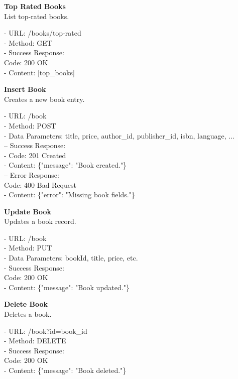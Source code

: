 \begin{flushleft}
\textbf{Top Rated Books} \\
List top-rated books.

- URL: /books/top-rated \\
- Method: GET \\
- Success Response: \\
Code: 200 OK \\
- Content: [top\_books]
\end{flushleft}

\begin{flushleft}
\textbf{Insert Book} \\
Creates a new book entry.

- URL: /book \\
- Method: POST \\
- Data Parameters: title, price, author\_id, publisher\_id, isbn, language, ... \\
– Success Response: \\
- Code: 201 Created \\
- Content: \{"message": "Book created."\} \\
– Error Response: \\
Code: 400 Bad Request \\
- Content: \{"error": "Missing book fields."\}
\end{flushleft}

\begin{flushleft}
\textbf{Update Book} \\
Updates a book record.

- URL: /book \\
- Method: PUT \\
- Data Parameters: bookId, title, price, etc. \\
- Success Response: \\
Code: 200 OK \\
- Content: \{"message": "Book updated."\}
\end{flushleft}

\begin{flushleft}
\textbf{Delete Book} \\
Deletes a book.

- URL: /book?id={book\_id} \\
- Method: DELETE \\
- Success Response: \\
Code: 200 OK \\
- Content: \{"message": "Book deleted."\}
\end{flushleft}

